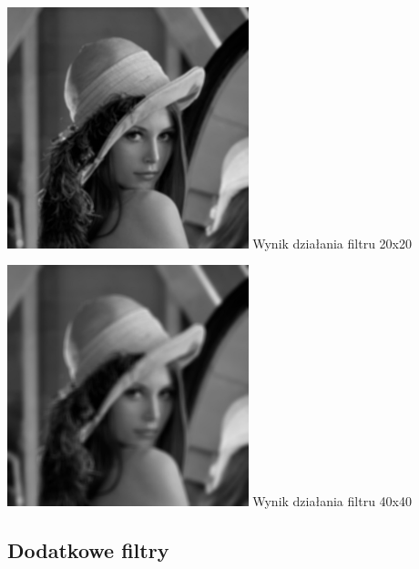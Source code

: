 \documentclass[a4paper,12pt,openany]{report}
\begin{document}
\begin{center}
\includegraphics[width=7cm]{resources/modified/lena/lena_blur_20x20.jpg}
\linebreak
\tiny{Wynik działania filtru 20x20}
\end{center}

\begin{center}
\includegraphics[width=7cm]{resources/modified/lena/lena_blur_40x40.jpg}
\linebreak
\tiny{Wynik działania filtru 40x40}
\end{center}

\pagebreak
\subsection{Dodatkowe filtry}
\end{document}
